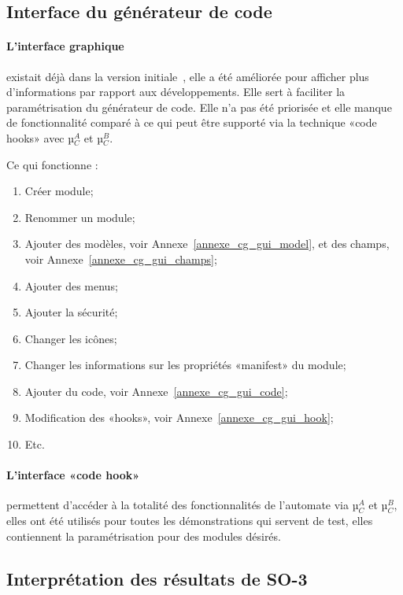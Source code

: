 \subsection{Interface du générateur de code}

\paragraph{L'interface graphique}

 existait déjà dans la version initiale~\cite{bluiksnot_repo}, elle a été améliorée pour afficher plus d'informations par rapport aux développements. Elle sert à faciliter la paramétrisation du générateur de code. Elle n’a pas été priorisée et elle manque de fonctionnalité comparé à ce qui peut être supporté via la technique «code hooks» avec µ$_C^A$ et µ$_C^B$.

Ce qui fonctionne : 
\begin{enumerate}
    \item Créer module;
    \item Renommer un module;
    \item Ajouter des modèles, voir Annexe~\ref{annexe_cg_gui_model}, et des champs, voir Annexe~\ref{annexe_cg_gui_champs};
    \item Ajouter des menus;
    \item Ajouter la sécurité;
    \item Changer les icônes;
    \item Changer les informations sur les propriétés «manifest» du module;
    \item Ajouter du code, voir Annexe~\ref{annexe_cg_gui_code};
    \item Modification des «hooks», voir Annexe~\ref{annexe_cg_gui_hook};
    \item Etc.
\end{enumerate}

\paragraph{L'interface «code hook»}


permettent d’accéder à la totalité des fonctionnalités de l’automate via µ$_C^A$ et µ$_C^B$, elles ont été utilisés pour toutes les démonstrations qui servent de test, elles contiennent la paramétrisation pour des modules désirés.

\subsection{Interprétation des résultats de SO-3}

